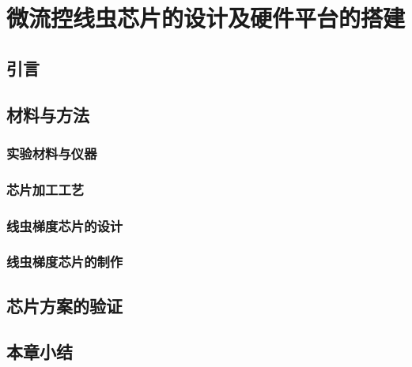 \chapter{微流控线虫芯片的设计及硬件平台的搭建}
\section{引言}
\section{材料与方法}
\subsection{实验材料与仪器}
\subsection{芯片加工工艺}
\subsection{线虫梯度芯片的设计}
\subsection{线虫梯度芯片的制作}
\section{芯片方案的验证}
\section{本章小结}
